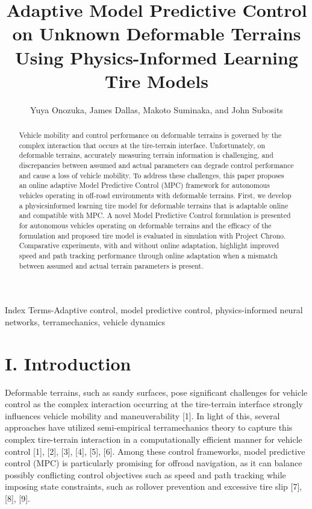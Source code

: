 \documentclass[10pt]{article}
\title{Adaptive Model Predictive Control on Unknown Deformable Terrains Using Physics-Informed Learning Tire Models }
\author{Yuya Onozuka, James Dallas, Makoto Suminaka, and John Subosits}
\date{}
\begin{document}
\maketitle
\captionsetup{singlelinecheck=false}


\begin{abstract}
Vehicle mobility and control performance on deformable terrains is governed by the complex interaction that occurs at the tire-terrain interface. Unfortunately, on deformable terrains, accurately measuring terrain information is challenging, and discrepancies between assumed and actual parameters can degrade control performance and cause a loss of vehicle mobility. To address these challenges, this paper proposes an online adaptive Model Predictive Control (MPC) framework for autonomous vehicles operating in off-road environments with deformable terrains. First, we develop a physicsinformed learning tire model for deformable terrains that is adaptable online and compatible with MPC. A novel Model Predictive Control formulation is presented for autonomous vehicles operating on deformable terrains and the efficacy of the formulation and proposed tire model is evaluated in simulation with Project Chrono. Comparative experiments, with and without online adaptation, highlight improved speed and path tracking performance through online adaptation when a mismatch between assumed and actual terrain parameters is present.
\end{abstract}

Index Terms-Adaptive control, model predictive control, physics-informed neural networks, terramechanics, vehicle dynamics

\section*{I. Introduction}
Deformable terrains, such as sandy surfaces, pose significant challenges for vehicle control as the complex interaction occurring at the tire-terrain interface strongly influences vehicle mobility and maneuverability [1]. In light of this, several approaches have utilized semi-empirical terramechanics theory to capture this complex tire-terrain interaction in a computationally efficient manner for vehicle control [1], [2], [3], [4], [5], [6]. Among these control frameworks, model predictive control (MPC) is particularly promising for offroad navigation, as it can balance possibly conflicting control objectives such as speed and path tracking while imposing state constraints, such as rollover prevention and excessive tire slip [7], [8], [9].
\end{document}
